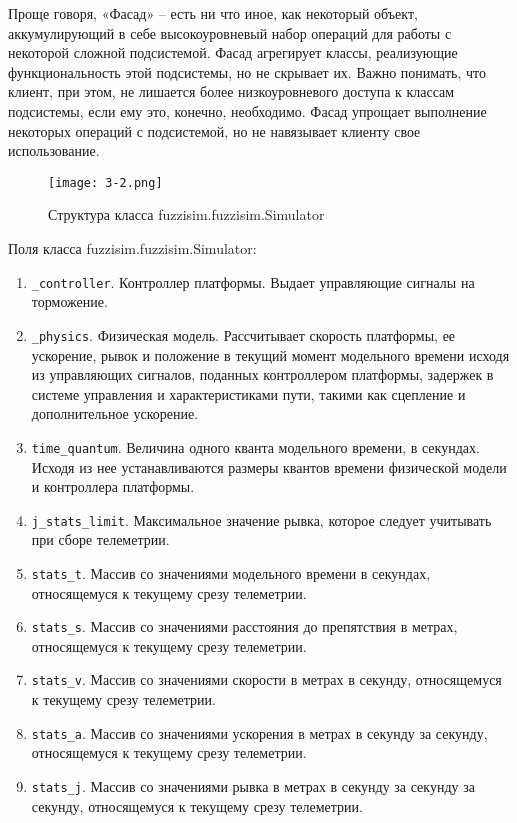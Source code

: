 Проще говоря, «Фасад» – есть ни что иное, как некоторый объект, аккумулирующий в себе высокоуровневый набор операций для работы с некоторой сложной подсистемой. Фасад агрегирует классы, реализующие функциональность этой подсистемы, но не скрывает их. Важно понимать, что клиент, при этом, не лишается более низкоуровневого доступа к классам подсистемы, если ему это, конечно, необходимо. Фасад упрощает выполнение некоторых операций с подсистемой, но не навязывает клиенту свое использование.

\begin{figure}[ht]
  \centering
  \texttt{[image: 3-2.png]}
  \caption{ Структура класса fuzzisim.fuzzisim.Simulator}
\end{figure}

Поля класса fuzzisim.fuzzisim.Simulator:
\begin{enumerate}[label=\arabic*)]
	\item \lstinline!_controller!. Контроллер платформы. Выдает управляющие сигналы на торможение.
	\item \lstinline!_physics!. Физическая модель. Рассчитывает скорость платформы, ее ускорение, рывок и положение в текущий момент модельного времени исходя из управляющих сигналов, поданных контроллером платформы, задержек в системе управления  и характеристиками пути, такими как сцепление и дополнительное ускорение.
	\item \lstinline!time_quantum!. Величина одного кванта модельного времени, в секундах. Исходя из нее устанавливаются размеры квантов времени физической модели и контроллера платформы.
	\item \lstinline!j_stats_limit!. Максимальное значение рывка, которое следует учитывать при сборе телеметрии.
	\item \lstinline!stats_t!. Массив со значениями модельного времени в секундах, относящемуся к текущему срезу телеметрии.
	\item \lstinline!stats_s!. Массив со значениями расстояния до препятствия в метрах, относящемуся к текущему срезу телеметрии.
	\item \lstinline!stats_v!. Массив со значениями скорости в метрах в секунду, относящемуся к текущему срезу телеметрии.
	\item \lstinline!stats_a!. Массив со значениями ускорения в метрах в секунду за секунду, относящемуся к текущему срезу телеметрии.
	\item \lstinline!stats_j!. Массив со значениями рывка в метрах в секунду за секунду за секунду, относящемуся к текущему срезу телеметрии.
\end{enumerate}

